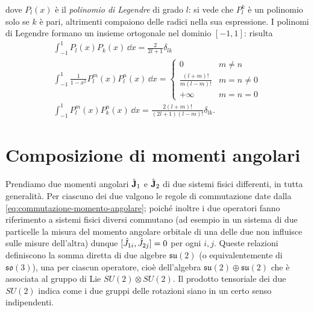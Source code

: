 dove $P_l(x)$ è il \emph{polinomio di Legendre} di grado $l$: si vede che $P_l^k$ è un polinomio solo se $k$ è pari, altrimenti compaiono delle radici nella sua espressione.
I polinomi di Legendre formano un insieme ortogonale nel dominio $[-1,1]$: risulta
\begin{equation}
	\begin{gathered}
		\int_{-1}^1P_l(x)P_k(x)\,\dd x=\frac{2}{2l+1}\delta_{lk}\\
		\int_{-1}^1\frac1{1-x^2}P_l^m(x)P_l^n(x)\,\dd x=
		\begin{cases}
			0						&m\ne n\\
			\frac{(l+m)!}{m(l-m)!}	&m=n\ne 0\\
			+\infty					&m=n=0
		\end{cases}\\
		\int_{-1}^1P_l^m(x)P_k^n(x)\,\dd x=\frac{2(l+m)!}{(2l+1)(l-m)!}\delta_{lk}.
	\end{gathered}
	\label{eq:ortogonalita-legendre}
\end{equation}

\section{Composizione di momenti angolari}
Prendiamo due momenti angolari $\hat{\mathbf{J}}_1$ e $\hat{\mathbf{J}}_2$ di due sistemi fisici differenti, in tutta generalità.
Per ciascuno dei due valgono le regole di commutazione date dalla \eqref{eq:commutazione-momento-angolare}; poich\'e inoltre i due operatori fanno riferimento a sistemi fisici diversi commutano (ad esempio in un sistema di due particelle la misura del momento angolare orbitale di una delle due non influisce sulle misure dell'altra) dunque $[\hat{J}_{1i},\hat{J}_{2j}]=0$ per ogni $i,j$.
Queste relazioni definiscono la somma diretta di due algebre $\mathfrak{su}(2)$ (o equivalentemente di $\mathfrak{so}(3)$), una per ciascun operatore, cioè dell'algebra $\mathfrak{su}(2)\oplus\mathfrak{su}(2)$ che è associata al gruppo di Lie $SU(2)\otimes SU(2)$.
Il prodotto tensoriale dei due $SU(2)$ indica come i due gruppi delle rotazioni siano in un certo senso indipendenti.

